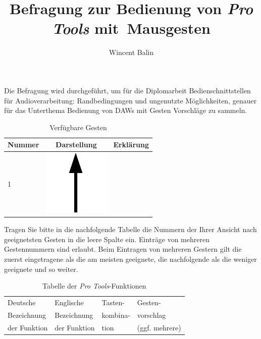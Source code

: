 \documentclass[11pt,a4paper,notitlepage]{article}
\author{Wincent Balin}
\title{Befragung zur Bedienung von \emph{Pro Tools} mit~Mausgesten}
\begin{document}
\maketitle

Die Befragung wird durchgeführt, um für die Diplomarbeit
\textsf{Bedienschnittstellen für Audioverarbeitung: Randbedingungen und ungenutzte Möglichkeiten},
genauer für das Unterthema \textsf{Bedienung von DAWs mit Gesten} Vorschläge zu sammeln.

\begin{table}[ht] \label{tab:Gestures}
\centering
\begin{tabular}{lcl} \toprule
Nummer & Darstellung & Erklärung \\ \midrule \midrule
 1 & \includegraphics[scale=0.25]{img/up} & \\ \midrule
\end{tabular}
\caption{Verfügbare Gesten}
\end{table}

Tragen Sie bitte in die nachfolgende Tabelle die Nummern der Ihrer Ansicht nach geeignetsten Gesten
in die leere Spalte ein. Einträge von mehreren Gestennummern sind erlaubt. Beim Eintragen von mehreren
Gestern gilt die zuerst eingetragene als die am meisten geeignete, die nachfolgende als die weniger geeignete
und so weiter.

\begin{table}[ht] \label{tab:Functions}
\centering
\begin{tabular}{llll} \toprule
Deutsche     & Englische    & Tasten-  & Gesten-        \\
Bezeichnung  & Bezeichnung  & kombina- & vorschlag      \\
der Funktion & der Funktion & tion     & (ggf. mehrere) \\ \midrule \midrule
\end{tabular}
\caption{Tabelle der \emph{Pro Tools}-Funktionen}
\end{table}
\end{document}
